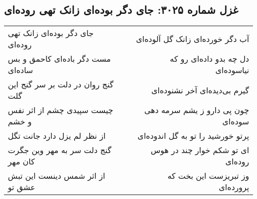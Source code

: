 \begin{center}
\section*{غزل شماره ۳۰۲۵: جای دگر بوده‌ای زانک تهی روده‌ای}
\label{sec:3025}
\begin{longtable}{l p{0.5cm} r}
جای دگر بوده‌ای زانک تهی روده‌ای
&&
آب دگر خورده‌ای زانک گل آلوده‌ای
\\
مست دگر باده‌ای کاحمق و بس ساده‌ای
&&
دل چه بدو داده‌ای رو که نیاسوده‌ای
\\
گنج روان در دلت بر سر گنج این گلت
&&
گیرم بی‌دیده‌ای آخر نشنوده‌ای
\\
چیست سپیدی چشم از اثر نفس و خشم
&&
چون پی دارو ز یشم سرمه دهی سوده‌ای
\\
از نظر لم یزل دارد جانت تگل
&&
پرتو خورشید را تو به گل اندوده‌ای
\\
گنج دلت سر به مهر وین جگرت کان مهر
&&
ای تو شکم خوار چند در هوس روده‌ای
\\
از اثر شمس دینست این تبش عشق تو
&&
وز تبریزست این بخت که پرورده‌ای
\\
\end{longtable}
\end{center}

